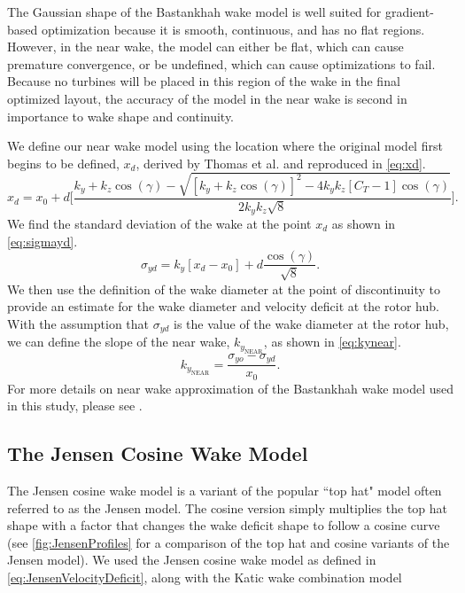 \documentclass[hidelinks,sort&compress,AMA,STIX1COL]{WileyNJD-v2}
\begin{document}
The Gaussian shape of the Bastankhah wake model is well suited for gradient-based optimization because it is smooth, continuous, and has no flat regions. However, in the near wake, the model can either be flat, which can cause premature convergence, or be undefined, which can cause optimizations to fail. Because no turbines will be placed in this region of the wake in the final optimized layout, the accuracy of the model in the near wake is second in importance to wake shape and continuity. 

We define our near wake model using the location where the original model first begins to be defined, $x_d$, derived by Thomas et al.\cite{thomas2019-les-validation} and reproduced in \cref{eq:xd}.
%
\begin{equation}\label{eq:xd}
x_d = x_0 +d \Bigg[ \frac{k_y+k_z\cos{(\gamma)} - \sqrt{[k_y+k_z\cos{(\gamma)}]^2-4k_y k_z[C_T-1]\cos{(\gamma)}}}{2k_y k_z\sqrt{8}}\Bigg].
\end{equation}
%
We find the standard deviation of the wake at the point $x_d$ as shown in \cref{eq:sigmayd}.
%
\begin{equation}\label{eq:sigmayd}
\sigma_{yd} = k_y [x_d - x_0] + d\frac{\cos{(\gamma)}}{\sqrt{8}}.
\end{equation}
%
We then use the definition of the wake diameter at the point of discontinuity to provide an estimate for the wake diameter and velocity deficit at the rotor hub. With the assumption that $\sigma_{yd}$ is the value of the wake diameter at the rotor hub, we can define the slope of the near wake, $k_{y_{\text{NEAR}}}$, as shown in \cref{eq:kynear}.
%
\begin{equation}\label{eq:kynear}
k_{y_{\text{NEAR}}} = \frac{\sigma_{yo}-\sigma_{yd}}{x_0}.
\end{equation}
For more details on near wake approximation of the Bastankhah wake model used in this study, please see \cite{thomas2019-les-validation}.

\subsection{The Jensen Cosine Wake Model}
The Jensen cosine wake model is a variant of the popular ``top hat" model often referred to as the Jensen model. The cosine version simply multiplies the top hat shape with a factor that changes the wake deficit shape to follow a cosine curve (see \cref{fig:JensenProfiles} for a comparison of the top hat and cosine variants of the Jensen model). We used the Jensen cosine wake model as defined in \cref{eq:JensenVelocityDeficit}, along with the Katic wake combination model \cite{katic1986}
\end{document}
